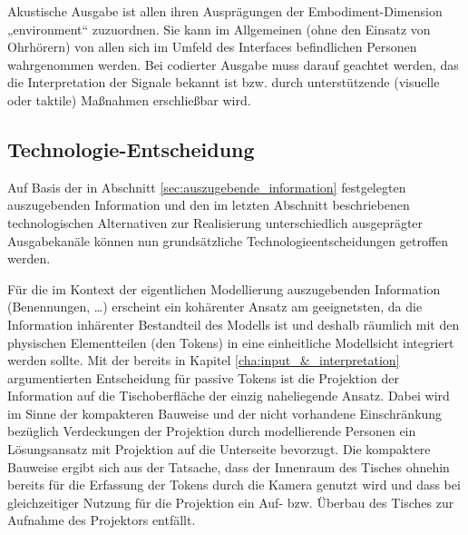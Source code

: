 Akustische Ausgabe ist allen ihren Ausprägungen der Embodiment-Dimension „environment“ zuzuordnen. Sie kann im Allgemeinen (ohne den Einsatz von Ohrhörern) von allen sich im Umfeld des Interfaces befindlichen Personen wahrgenommen werden. Bei codierter Ausgabe muss darauf geachtet werden, das die Interpretation der Signale bekannt ist bzw. durch unterstützende (visuelle oder taktile) Maßnahmen erschließbar wird.



\subsection{Technologie-Entscheidung} %
\label{sub:output_ansatz_entscheidung}

Auf Basis der in Abschnitt \ref{sec:auszugebende_information} festgelegten auszugebenden Information und den im letzten Abschnitt beschriebenen technologischen Alternativen zur Realisierung unterschiedlich ausgeprägter Ausgabekanäle können nun grundsätzliche Technologieentscheidungen getroffen werden.

Für die im Kontext der eigentlichen Modellierung auszugebenden Information (Benennungen, \ldots) erscheint ein kohärenter Ansatz am geeignetsten, da die Information inhärenter Bestandteil des Modells ist und deshalb räumlich mit den physischen Elementteilen (den Tokens) in eine einheitliche Modellsicht integriert werden sollte. Mit der bereits in Kapitel \ref{cha:input_&_interpretation} argumentierten Entscheidung für passive Tokens ist die Projektion der Information auf die Tischoberfläche der einzig naheliegende Ansatz. Dabei wird im Sinne der kompakteren Bauweise und der nicht vorhandene Einschränkung bezüglich Verdeckungen der Projektion durch modellierende Personen ein Lösungsansatz mit Projektion auf die Unterseite bevorzugt. Die kompaktere Bauweise ergibt sich aus der Tatsache, dass der Innenraum des Tisches ohnehin bereits für die Erfassung der Tokens durch die Kamera genutzt wird und dass bei gleichzeitiger Nutzung für die Projektion ein Auf- bzw. Überbau des Tisches zur Aufnahme des Projektors entfällt.

